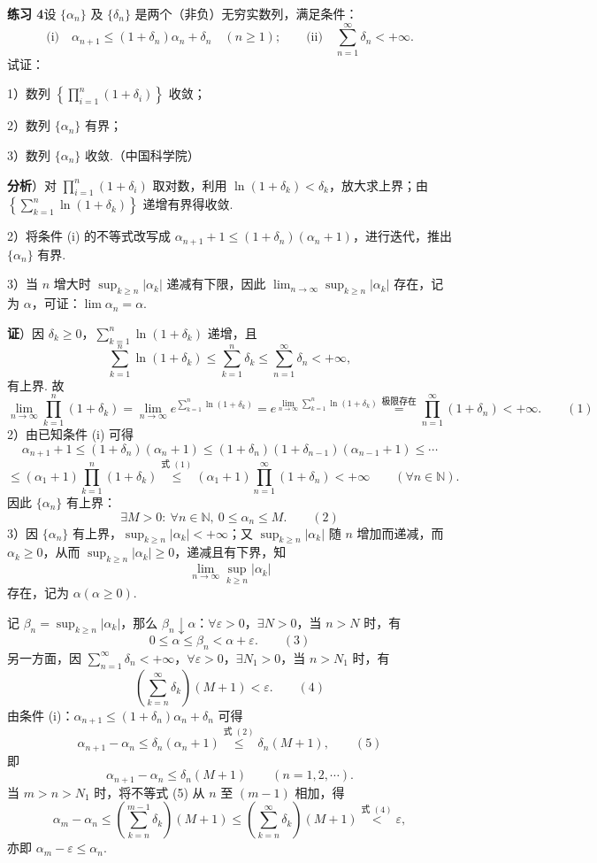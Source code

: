 \documentclass[UTF8,12pt,a4paper,fontset=fandol]{ctexart}
\begin{document}
\noindent\textbf{练习 4}\quad 设 $\{\alpha_n\}$ 及 $\{\delta_n\}$ 是两个（非负）无穷实数列，满足条件：
\[
  \text{(i)}\quad \alpha_{n+1}\le(1+\delta_n)\alpha_n+\delta_n\quad(n\ge1);
  \qquad
  \text{(ii)}\quad \sum_{n=1}^\infty\delta_n<+\infty.
\]
试证：

1）数列 $\left\{\displaystyle\prod_{i=1}^n(1+\delta_i)\right\}$ 收敛；

2）数列 $\{\alpha_n\}$ 有界；

3）数列 $\{\alpha_n\}$ 收敛.（中国科学院）

\noindent\textbf{分析}）对 $\displaystyle\prod_{i=1}^n(1+\delta_i)$ 取对数，利用 $\ln(1+\delta_k)<\delta_k$，放大求上界；由 $\left\{\displaystyle\sum_{k=1}^n\ln(1+\delta_k)\right\}$ 递增有界得收敛.

2）将条件 (i) 的不等式改写成 $\alpha_{n+1}+1\le(1+\delta_n)(\alpha_n+1)$，进行迭代，推出 $\{\alpha_n\}$ 有界.

3）当 $n$ 增大时 $\sup_{k\ge n}|\alpha_k|$ 递减有下限，因此 $\displaystyle\lim_{n\to\infty}\sup_{k\ge n}|\alpha_k|$ 存在，记为 $\alpha$，可证：$\lim\alpha_n=\alpha$.

\noindent\textbf{证}）因 $\delta_k\ge0$，$\displaystyle\sum_{k=1}^n\ln(1+\delta_k)$ 递增，且
\[
  \sum_{k=1}^n\ln(1+\delta_k)\le\sum_{k=1}^n\delta_k\le\sum_{n=1}^\infty\delta_n<+\infty,
\]
有上界. 故
\[
  \lim_{n\to\infty}\prod_{k=1}^n(1+\delta_k)
  =\lim_{n\to\infty}e^{\sum_{k=1}^n\ln(1+\delta_k)}
  =e^{\lim_{n\to\infty}\sum_{k=1}^n\ln(1+\delta_k)}
  \stackrel{\text{极限存在}}{=}\prod_{n=1}^\infty(1+\delta_n)<+\infty.
\qquad(1)
\]
2）由已知条件 (i) 可得
\[
  \alpha_{n+1}+1\le(1+\delta_n)(\alpha_n+1)
  \le(1+\delta_n)(1+\delta_{n-1})(\alpha_{n-1}+1)\le\cdots
\]
\[
  \le(\alpha_1+1)\prod_{k=1}^n(1+\delta_k)
  \stackrel{\text{式 }(1)}{\le}
  (\alpha_1+1)\prod_{n=1}^\infty(1+\delta_n)<+\infty\qquad(\forall n\in\mathbb{N}).
\]
因此 $\{\alpha_n\}$ 有上界：
\[
  \exists M>0:\ \forall n\in\mathbb{N},\ 0\le\alpha_n\le M.
\qquad(2)
\]
3）因 $\{\alpha_n\}$ 有上界，$\sup_{k\ge n}|\alpha_k|<+\infty$；又 $\sup_{k\ge n}|\alpha_k|$ 随 $n$ 增加而递减，而 $\alpha_k\ge0$，从而 $\sup_{k\ge n}|\alpha_k|\ge0$，递减且有下界，知
\[
  \lim_{n\to\infty}\sup_{k\ge n}|\alpha_k|
\]
存在，记为 $\alpha(\alpha\ge0)$.

记 $\beta_n=\sup_{k\ge n}|\alpha_k|$，那么 $\beta_n\downarrow\alpha$：$\forall\varepsilon>0$，$\exists N>0$，当 $n>N$ 时，有
\[
  0\le\alpha\le\beta_n<\alpha+\varepsilon.
\qquad(3)
\]
另一方面，因 $\displaystyle\sum_{n=1}^\infty\delta_n<+\infty$，$\forall\varepsilon>0$，$\exists N_1>0$，当 $n>N_1$ 时，有
\[
  \left(\sum_{k=n}^\infty\delta_k\right)(M+1)<\varepsilon.
\qquad(4)
\]
由条件 (i)：$\alpha_{n+1}\le(1+\delta_n)\alpha_n+\delta_n$ 可得
\[
  \alpha_{n+1}-\alpha_n\le\delta_n(\alpha_n+1)
  \stackrel{\text{式 }(2)}{\le}\delta_n(M+1),
\qquad(5)
\]
即
\[
  \alpha_{n+1}-\alpha_n\le\delta_n(M+1)\qquad(n=1,2,\cdots).
\]
当 $m>n>N_1$ 时，将不等式 (5) 从 $n$ 至 $(m-1)$ 相加，得
\[
  \alpha_m-\alpha_n\le\left(\sum_{k=n}^{m-1}\delta_k\right)(M+1)
  \le\left(\sum_{k=n}^{\infty}\delta_k\right)(M+1)
  \stackrel{\text{式 }(4)}{<}\varepsilon,
\]
亦即 $\alpha_m-\varepsilon\le\alpha_n$.
\end{document}
